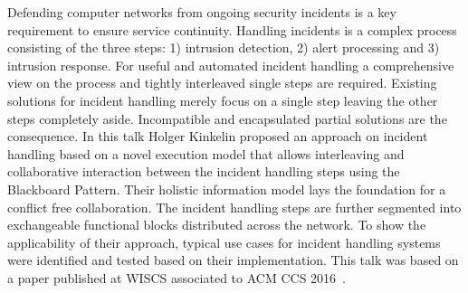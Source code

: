 Defending computer networks from ongoing security incidents is a key
requirement to ensure service continuity. Handling incidents is a complex
process consisting of the three steps: 1) intrusion detection, 2) alert
processing and 3) intrusion response. For useful and automated incident
handling a comprehensive view on the process and tightly interleaved single
steps are required. Existing solutions for incident handling merely focus on a
single step leaving the other steps completely aside. Incompatible and
encapsulated partial solutions are the consequence. In this talk Holger
Kinkelin proposed an approach on incident handling based on a novel execution
model that allows interleaving and collaborative interaction between the
incident handling steps using the Blackboard Pattern. Their holistic
information model lays the foundation for a conflict free collaboration. The
incident handling steps are further segmented into exchangeable functional
blocks distributed across the network. To show the applicability of their
approach, typical use cases for incident handling systems were identified and
tested based on their implementation. This talk was based on a paper published
at WISCS associated to ACM CCS 2016~\cite{Herold2016}.
